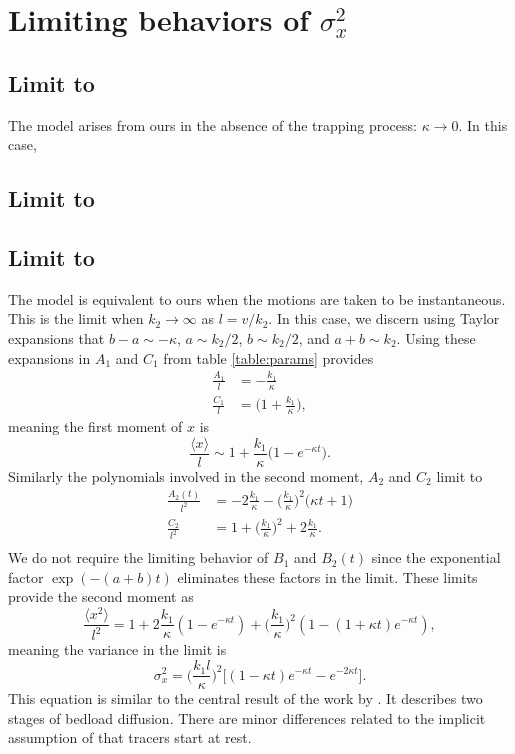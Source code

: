 \documentclass[]{agujournal2018}
\newcommand\be{\begin{equation}}
\newcommand\ee{\end{equation}}
\newcommand\bra{\langle}
\newcommand\ket{\rangle}
\begin{document}
\section{Limiting behaviors of $\sigma_x^2$}
\label{sec:appendixC}
\subsection{Limit to \citet{Lisle1998}}
The \citet{Lisle1998} model arises from ours in the absence of the trapping process: $\kappa \rightarrow 0$.
In this case, 
\subsection{Limit to \citet{Einstein1937}}
\subsection{Limit to \citet{Wu2019}}
The \citet{Wu2019} model is equivalent to ours when the motions are taken to be instantaneous. This is the limit when $k_2 \rightarrow \infty$ as $l=v/k_2$.
In this case, we discern using Taylor expansions that $b-a \sim -\kappa$, $ a \sim k_2/2$, $b\sim k_2/2$, and $a+b \sim k_2$.
Using these expansions in $A_1$ and $C_1$ from table \ref{table:params} provides
\begin{align}
\frac{A_1}{l} &= -\frac{k_1}{\kappa}\\
\frac{C_1}{l} &= \big(1+\frac{k_1}{\kappa}\big),
\end{align}
meaning the first moment of $x$ is 
\be \frac{\bra x \ket}{l} \sim 1 + \frac{k_1}{\kappa}\big(1-e^{-\kappa t}\big).\ee
Similarly the polynomials involved in the second moment, $A_2$ and $C_2$ limit to 
\begin{align}
\frac{A_2(t)}{l^2} &= -2\frac{k_1}{\kappa} - \Big(\frac{k_1}{\kappa}\Big)^2\big(\kappa t+ 1\big)\\
\frac{C_2}{l^2} &=1+ \Big(\frac{k_1}{\kappa}\Big)^2 + 2\frac{k_1}{\kappa}.\\
\end{align}
We do not require the limiting behavior of $B_1$ and $B_2(t)$ since the exponential factor $\exp(-(a+b)t)$ eliminates these factors in the limit.
These limits provide the second moment as 
\be \frac{\bra x^2 \ket}{l^2} = 1 + 2 \frac{k_1}{\kappa}(1-e^{-\kappa t}) + \Big(\frac{k_1}{\kappa}\Big)^2 (1-(1+\kappa t)e^{-\kappa t}),\ee
meaning the variance in the \citet{Wu2019} limit is 
\be \sigma_x^2 = \Big(\frac{k_1 l}{\kappa}\Big)^2 \Big[(1-\kappa t)e^{-\kappa t}-e^{-2\kappa t}\Big].\label{eq:wuvar}\ee
This equation is similar to the central result of the work by \citet{Wu2019}. It describes two stages of bedload diffusion.
There are minor differences related to the implicit assumption of \citet{Wu2019} that tracers start at rest.
\end{document}
